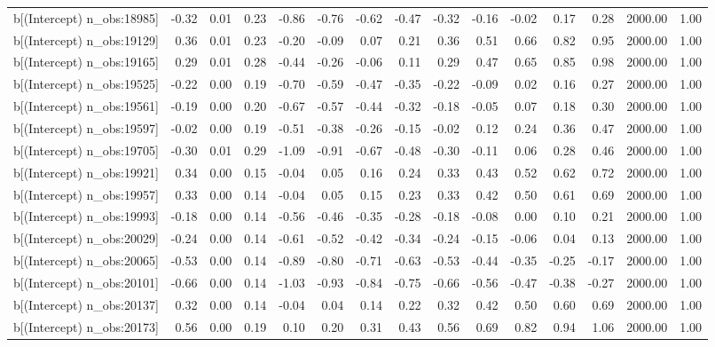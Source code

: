 \begin{table}[ht]
\begin{tabular}{rrrrrrrrrrrrrrr}
  b[(Intercept) n\_obs:18985] & -0.32 & 0.01 & 0.23 & -0.86 & -0.76 & -0.62 & -0.47 & -0.32 & -0.16 & -0.02 & 0.17 & 0.28 & 2000.00 & 1.00 \\ 
  b[(Intercept) n\_obs:19129] & 0.36 & 0.01 & 0.23 & -0.20 & -0.09 & 0.07 & 0.21 & 0.36 & 0.51 & 0.66 & 0.82 & 0.95 & 2000.00 & 1.00 \\ 
  b[(Intercept) n\_obs:19165] & 0.29 & 0.01 & 0.28 & -0.44 & -0.26 & -0.06 & 0.11 & 0.29 & 0.47 & 0.65 & 0.85 & 0.98 & 2000.00 & 1.00 \\ 
  b[(Intercept) n\_obs:19525] & -0.22 & 0.00 & 0.19 & -0.70 & -0.59 & -0.47 & -0.35 & -0.22 & -0.09 & 0.02 & 0.16 & 0.27 & 2000.00 & 1.00 \\ 
  b[(Intercept) n\_obs:19561] & -0.19 & 0.00 & 0.20 & -0.67 & -0.57 & -0.44 & -0.32 & -0.18 & -0.05 & 0.07 & 0.18 & 0.30 & 2000.00 & 1.00 \\ 
  b[(Intercept) n\_obs:19597] & -0.02 & 0.00 & 0.19 & -0.51 & -0.38 & -0.26 & -0.15 & -0.02 & 0.12 & 0.24 & 0.36 & 0.47 & 2000.00 & 1.00 \\ 
  b[(Intercept) n\_obs:19705] & -0.30 & 0.01 & 0.29 & -1.09 & -0.91 & -0.67 & -0.48 & -0.30 & -0.11 & 0.06 & 0.28 & 0.46 & 2000.00 & 1.00 \\ 
  b[(Intercept) n\_obs:19921] & 0.34 & 0.00 & 0.15 & -0.04 & 0.05 & 0.16 & 0.24 & 0.33 & 0.43 & 0.52 & 0.62 & 0.72 & 2000.00 & 1.00 \\ 
  b[(Intercept) n\_obs:19957] & 0.33 & 0.00 & 0.14 & -0.04 & 0.05 & 0.15 & 0.23 & 0.33 & 0.42 & 0.50 & 0.61 & 0.69 & 2000.00 & 1.00 \\ 
  b[(Intercept) n\_obs:19993] & -0.18 & 0.00 & 0.14 & -0.56 & -0.46 & -0.35 & -0.28 & -0.18 & -0.08 & 0.00 & 0.10 & 0.21 & 2000.00 & 1.00 \\ 
  b[(Intercept) n\_obs:20029] & -0.24 & 0.00 & 0.14 & -0.61 & -0.52 & -0.42 & -0.34 & -0.24 & -0.15 & -0.06 & 0.04 & 0.13 & 2000.00 & 1.00 \\ 
  b[(Intercept) n\_obs:20065] & -0.53 & 0.00 & 0.14 & -0.89 & -0.80 & -0.71 & -0.63 & -0.53 & -0.44 & -0.35 & -0.25 & -0.17 & 2000.00 & 1.00 \\ 
  b[(Intercept) n\_obs:20101] & -0.66 & 0.00 & 0.14 & -1.03 & -0.93 & -0.84 & -0.75 & -0.66 & -0.56 & -0.47 & -0.38 & -0.27 & 2000.00 & 1.00 \\ 
  b[(Intercept) n\_obs:20137] & 0.32 & 0.00 & 0.14 & -0.04 & 0.04 & 0.14 & 0.22 & 0.32 & 0.42 & 0.50 & 0.60 & 0.69 & 2000.00 & 1.00 \\ 
  b[(Intercept) n\_obs:20173] & 0.56 & 0.00 & 0.19 & 0.10 & 0.20 & 0.31 & 0.43 & 0.56 & 0.69 & 0.82 & 0.94 & 1.06 & 2000.00 & 1.00 \\ 

\end{tabular}
\end{table}
